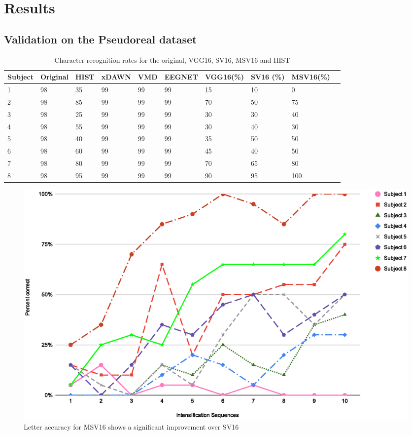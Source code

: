 \documentclass[conference]{IEEEtran}
\begin{document}
\section{Results}
\label{sec:results}


\subsection{Validation on the Pseudoreal dataset}


\begin{table}[h]
\centering
\begin{tabular}{ |p{1cm}||p{1cm}|p{1cm}|p{1cm}|p{1cm}|p{1cm}|p{1cm}|p{1cm}|p{1cm}|p{1cm} |}
 \hline
 Subject & Original & HIST & xDAWN & VMD & EEGNET & VGG16(\%) & SV16 (\%)  & MSV16(\%) \\
 \hline
 1 & 98 & 35 & 99 & 99 & 99 & 15 & 10 & 0 \\
 2 & 98 & 85 & 99 & 99 & 99 & 70 & 50 & 75 \\
 3 & 98 & 25 & 99 & 99 & 99 & 30 & 30 & 40 \\
 4 & 98 & 55 & 99 & 99 & 99 & 30 & 40 & 30 \\
 5 & 98 & 40 & 99 & 99 & 99 & 35 & 50 & 50 \\
 6 & 98 & 60 & 99 & 99 & 99 & 45 & 40 & 50 \\
 7 & 98 & 80 & 99 & 99 & 99 & 70 & 65 & 80 \\
 8 & 98 & 95 & 99 & 99 & 99 & 90 & 95 & 100 \\
 \hline
\end{tabular}
\caption[MSV16 accuracy comparison]{Character recognition rates for the original, VGG16, SV16, MSV16 and HIST}
\label{tab:resultsv1v2v3}
\end{table}

\begin{figure}[h]
  \centering
  \includegraphics[width=\linewidth]{images/v3intensification.eps}
  \caption[MSV16 Letter accuracy]{Letter accuracy for MSV16 shows a significant improvement over SV16}
  \label{image:v3intensification}
\end{figure}
\end{document}
